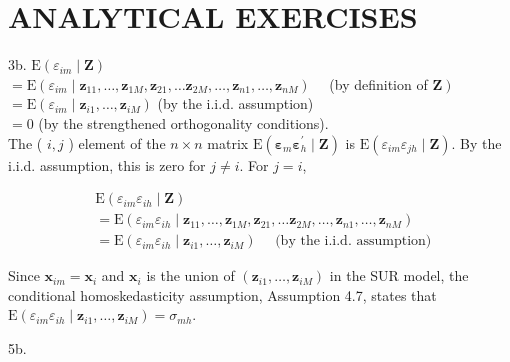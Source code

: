 \documentclass[10pt]{article}
\begin{document}
\section*{ANALYTICAL EXERCISES}
3b. $\mathrm{E}\left(\varepsilon_{i m} \mid \mathbf{Z}\right)$\\
$=\mathrm{E}\left(\varepsilon_{i m} \mid \mathbf{z}_{11}, \ldots, \mathbf{z}_{1 M}, \mathbf{z}_{21}, \ldots \mathbf{z}_{2 M}, \ldots, \mathbf{z}_{n 1}, \ldots, \mathbf{z}_{n M}\right) \quad$ (by definition of $\left.\mathbf{Z}\right)$\\
$=\mathrm{E}\left(\varepsilon_{i m} \mid \mathbf{z}_{i 1}, \ldots, \mathbf{z}_{i M}\right)$ (by the i.i.d. assumption)\\
$=0$ (by the strengthened orthogonality conditions).\\
The ( $i, j$ ) element of the $n \times n$ matrix $\mathrm{E}\left(\boldsymbol{\varepsilon}_{m} \boldsymbol{\varepsilon}_{h}^{\prime} \mid \mathbf{Z}\right)$ is $\mathrm{E}\left(\varepsilon_{i m} \varepsilon_{j h} \mid \mathbf{Z}\right)$. By the i.i.d. assumption, this is zero for $j \neq i$. For $j=i$,

$$
\begin{aligned}
& \mathrm{E}\left(\varepsilon_{i m} \varepsilon_{i h} \mid \mathbf{Z}\right) \\
& =\mathrm{E}\left(\varepsilon_{i m} \varepsilon_{i h} \mid \mathbf{z}_{11}, \ldots, \mathbf{z}_{1 M}, \mathbf{z}_{21}, \ldots \mathbf{z}_{2 M}, \ldots, \mathbf{z}_{n 1}, \ldots, \mathbf{z}_{n M}\right) \\
& =\mathrm{E}\left(\varepsilon_{i m} \varepsilon_{i h} \mid \mathbf{z}_{i 1}, \ldots, \mathbf{z}_{i M}\right) \quad \text { (by the i.i.d. assumption) }
\end{aligned}
$$

Since $\mathbf{x}_{i m}=\mathbf{x}_{i}$ and $\mathbf{x}_{i}$ is the union of $\left(\mathbf{z}_{i 1}, \ldots, \mathbf{z}_{i M}\right)$ in the SUR model, the conditional homoskedasticity assumption, Assumption 4.7, states that $\mathrm{E}\left(\varepsilon_{i m} \varepsilon_{i h} \mid\right. \left.\mathbf{z}_{i 1}, \ldots, \mathbf{z}_{i M}\right)=\sigma_{m h}$.

5b.
\end{document}
